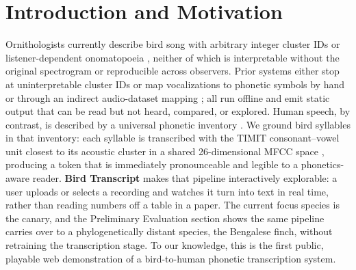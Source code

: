 \documentclass[letterpaper]{article} %
\begin{document}
\section{Introduction and Motivation}
Ornithologists currently describe bird song with arbitrary integer cluster
IDs \citep{gofman2021tweetybert} or listener-dependent onomatopoeia
\citep{onomatopoeia}, neither of which is interpretable without the
original spectrogram or reproducible across observers. Prior systems either
stop at uninterpretable cluster IDs \citep{gofman2021tweetybert,corvid} or
map vocalizations to phonetic symbols by hand or through an indirect
audio-dataset mapping \citep{ispa,huang2023shibascript}; all run offline and
emit static output that can be read but not heard, compared, or explored.
Human speech, by contrast, is described by a universal phonetic inventory
\citep{arpabet}. We ground bird syllables in that inventory:
each syllable is transcribed with the TIMIT \citep{timit1993}
consonant--vowel unit closest to its acoustic cluster in a shared
26-dimensional MFCC space \citep{davis1980mfcc}, producing a token that is
immediately pronounceable
and legible to a phonetics-aware reader. \textbf{Bird Transcript} makes
that pipeline interactively explorable: a user uploads or selects a
recording and watches it turn into text in real time, rather than reading
numbers off a table in a paper. The current focus species is the canary,
and the Preliminary Evaluation section shows the same pipeline carries over to
a phylogenetically distant species, the Bengalese finch, without retraining
the transcription stage. To our knowledge, this is the first public, playable web
demonstration of a bird-to-human phonetic transcription system.
\end{document}
